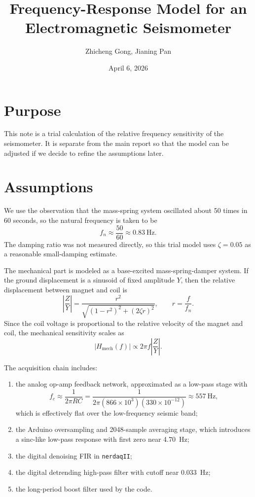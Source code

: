 \documentclass[11pt]{article}
\title{Frequency-Response Model for an Electromagnetic Seismometer}
\author{Zhicheng Gong, Jianing Pan}
\date{April 6, 2026}
\begin{document}
\maketitle

\section*{Purpose}
This note is a trial calculation of the relative frequency sensitivity of the seismometer. It is separate from the main report so that the model can be adjusted if we decide to refine the assumptions later.

\section*{Assumptions}
We use the observation that the mass-spring system oscillated about 50 times in 60 seconds, so the natural frequency is taken to be
\[
f_n \approx \frac{50}{60} \approx \SI{0.83}{\hertz}.
\]
The damping ratio was not measured directly, so this trial model uses $\zeta = 0.05$ as a reasonable small-damping estimate.

The mechanical part is modeled as a base-excited mass-spring-damper system. If the ground displacement is a sinusoid of fixed amplitude $Y$, then the relative displacement between magnet and coil is
\[
\left| \frac{Z}{Y} \right|
= \frac{r^2}{\sqrt{(1-r^2)^2 + (2 \zeta r)^2}},
\qquad
r = \frac{f}{f_n}.
\]
Since the coil voltage is proportional to the relative velocity of the magnet and coil, the mechanical sensitivity scales as
\[
|H_{\text{mech}}(f)| \propto 2 \pi f \left| \frac{Z}{Y} \right|.
\]

The acquisition chain includes:
\begin{enumerate}
  \item the analog op-amp feedback network, approximated as a low-pass stage with
  \[
  f_c \approx \frac{1}{2 \pi R C}
  = \frac{1}{2 \pi (866 \times 10^3)(330 \times 10^{-12})}
  \approx \SI{557}{\hertz},
  \]
  which is effectively flat over the low-frequency seismic band;
  \item the Arduino oversampling and 2048-sample averaging stage, which introduces a sinc-like low-pass response with first zero near \SI{4.70}{\hertz};
  \item the digital denoising FIR in \texttt{nerdaqII};
  \item the digital detrending high-pass filter with cutoff near \SI{0.033}{\hertz};
  \item the long-period boost filter used by the code.
\end{enumerate}
\end{document}
